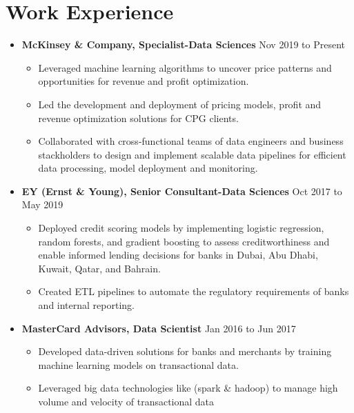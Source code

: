 \documentclass[a4paper,10pt]{article}
\begin{document}
\section*{Work Experience}
\begin{itemize}[leftmargin=0.2cm, label={}]
    \item \textbf{McKinsey \& Company, Specialist-Data Sciences} \hfill \textnormal{Nov 2019 to Present}
    \begin{itemize}[leftmargin=0.5cm, label={\textbullet}]
        \item Leveraged machine learning algorithms to uncover price patterns and opportunities for revenue and profit optimization.
        \item Led the development and deployment of pricing models, profit and revenue optimization solutions for CPG clients.
        \item Collaborated with cross-functional teams of data engineers and business stackholders to design and implement scalable data pipelines for efficient data processing, model deployment and monitoring.
    \end{itemize}
    
    \item \textbf{EY (Ernst \& Young), Senior Consultant-Data Sciences} \hfill \textnormal{Oct 2017 to May 2019}
    \begin{itemize}[leftmargin=0.5cm, label={\textbullet}]
        \item Deployed credit scoring models by implementing logistic regression, random forests, and gradient boosting to assess creditworthiness and enable informed lending decisions for banks in Dubai, Abu Dhabi, Kuwait, Qatar, and Bahrain.
        \item Created ETL pipelines to automate the regulatory requirements of banks and internal reporting.
    \end{itemize}
    
    \item \textbf{MasterCard Advisors, Data Scientist} \hfill \textnormal{Jan 2016 to Jun 2017}
    \begin{itemize}[leftmargin=0.5cm, label={\textbullet}]
        \item Developed data-driven solutions for banks and merchants by training machine learning models on transactional data.
        \item Leveraged big data technologies like (spark \& hadoop) to manage high volume and velocity of transactional data
    \end{itemize}
    

\end{itemize}
\end{document}
